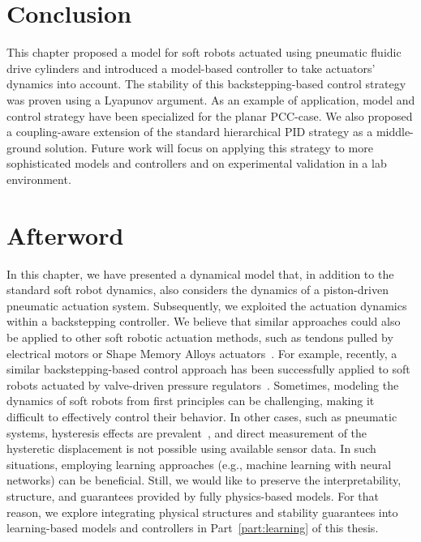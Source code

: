 \section{Conclusion}\label{sec:backstepping:conclusion}
%
This chapter proposed a model for soft robots actuated using pneumatic fluidic drive cylinders and introduced a model-based controller to take actuators' dynamics into account. The stability of this backstepping-based control strategy was proven using a Lyapunov argument.  As an example of application, model and control strategy have been specialized for the planar \gls{PCC}-case. We also proposed a coupling-aware extension of the standard hierarchical PID strategy as a middle-ground solution. %
%
Future work will focus on applying this strategy to more sophisticated models and controllers and on experimental validation in a lab environment. %

\section{Afterword}
In this chapter, we have presented a dynamical model that, in addition to the standard soft robot dynamics, also considers the dynamics of a piston-driven pneumatic actuation system. Subsequently, we exploited the actuation dynamics within a backstepping controller.
We believe that similar approaches could also be applied to other soft robotic actuation methods, such as tendons pulled by electrical motors or Shape Memory Alloys actuators~\cite{zaidi2021actuation}.
For example, recently, a similar backstepping-based control approach has been successfully applied to soft robots actuated by valve-driven pressure regulators~\cite{franco2024model}.
Sometimes, modeling the dynamics of soft robots from first principles can be challenging, making it difficult to effectively control their behavior. In other cases, such as pneumatic systems, hysteresis effects are prevalent~\cite{vo2010new}, and direct measurement of the hysteretic displacement is not possible using available sensor data.
In such situations, employing learning approaches (e.g., machine learning with neural networks) can be beneficial. Still, we would like to preserve the interpretability, structure, and guarantees provided by fully physics-based models. For that reason, we explore integrating physical structures and stability guarantees into learning-based models and controllers in Part~\ref{part:learning} of this thesis.